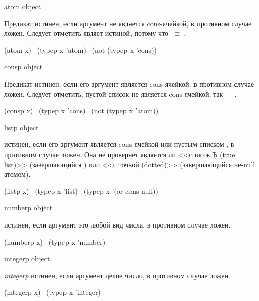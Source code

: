 \begin{defun}[Функция]
atom object

Предикат  истинен, если аргумент не является cons-ячейкой, в
противном случае ложен.
Следует отметить  являет истиной, потому что
{\emptylist}$\;\equiv\;${\nil}.
\begin{lisp}
(atom x) \EQ\ (typep x 'atom) \EQ\ (not (typep x 'cons))
\end{lisp}
\end{defun}

\begin{defun}[Функция]
consp object

Предикат  истинен, если его аргумент является cons-ячейкой,
в противном случае ложен.
Следует отметить, пустой список не является cons-ячейкой, так 
 \EQ\  \EV\ {\nil}. 
\begin{lisp}
(consp x) \EQ\ (typep x 'cons) \EQ\ (not (typep x 'atom))
\end{lisp}
\end{defun}

\begin{defun}[Функция]
listp object

 истинен, если его аргумент является cons-ячейкой или пустым
списком {\emptylist}, в противном случае ложен. Она не проверяет
является ли <<список Ъ (true list)>> (завершающийся {\nil}) или <<с точкой (dotted)>>
(завершающийся не-null атомом).
\begin{lisp}
(listp x) \EQ\ (typep x 'list) \EQ\ (typep x '(or cons null))
\end{lisp}
\end{defun}

\begin{defun}[Функция]
numberp object

 истинен, если аргумент это любой вид числа, в
противном случае ложен.
\begin{lisp}
(numberp x) \EQ\ (typep x 'number)
\end{lisp}
\end{defun}

\begin{defun}[Функция]
integerp object

\emph{integerp} истинен, если аргумент целое число, в противном
случае ложен.
\begin{lisp}
(integerp x) \EQ\ (typep x 'integer)
\end{lisp}
\end{defun}

